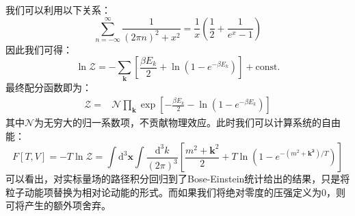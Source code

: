 我们可以利用以下关系：
\begin{equation}
    \sum_{n=-\infty}^{\infty}\frac{1}{(2\pi n)^2 + x^2} = \frac{1}{x}\left( \frac{1}{2} + \frac{1}{e^x -1} \right)
\end{equation}
因此我们可得：
\begin{equation}
    \ln\mathcal{Z}=-\sum_{\boldsymbol{k}} \left[ \frac{\beta E_k}{2} + \ln(1-e^{-\beta E_k}) \right] + \text{const.}
\end{equation}
最终配分函数即为：
\begin{align}
    \mathcal{Z}=&\mathcal{N}\prod_{\boldsymbol{k}}\exp\left[ -\frac{\beta E_k}{2}-\ln(1-e^{-\beta E_k}) \right]%
\end{align}
其中$\mathcal{N}$为无穷大的归一系数项，不贡献物理效应。此时我们可以计算系统的自由能：
\begin{equation}
    F[T,V] = -T\ln\mathcal{Z} = \int\mathrm{d}^3\boldsymbol{x}\int\frac{\mathrm{d}^3 k}{(2\pi)^3}\left[ \frac{m^2+\boldsymbol{k}^2}{2} + T\ln(1-e^{-(m^2+\boldsymbol{k^2})/T}) \right]
\end{equation}
可以看出，对实标量场的路径积分回归到了Bose-Einstein统计给出的结果，只是将粒子动能项替换为相对论动能的形式。而如果我们将绝对零度的压强定义为0，则可将产生的额外项舍弃。

